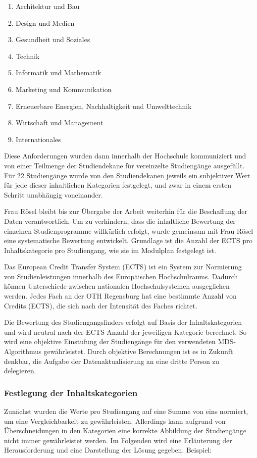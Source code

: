 \begin{enumerate}
    \item Architektur und Bau
    \item Design und Medien
    \item Gesundheit und Soziales
    \item Technik
    \item Informatik und Mathematik
    \item Marketing und Kommunikation
    \item Erneuerbare Energien, Nachhaltigkeit und Umwelttechnik
    \item Wirtschaft und Management
    \item Internationales
\end{enumerate}

Diese Anforderungen wurden dann innerhalb der Hochschule kommuniziert und von einer Teilmenge der Studiendekane für vereinzelte Studiengänge ausgefüllt. Für 22 Studiengänge wurde von den Studiendekanen jeweils ein subjektiver Wert für jede dieser inhaltlichen Kategorien festgelegt, und zwar in einem ersten Schritt unabhängig voneinander. %

Frau Rösel bleibt bis zur Übergabe der Arbeit weiterhin für die Beschaffung der Daten verantwortlich. Um zu verhindern, dass die inhaltliche Bewertung der einzelnen Studienprogramme willkürlich erfolgt, wurde gemeinsam mit Frau Rösel eine systematische Bewertung entwickelt. Grundlage ist die Anzahl der ECTS pro Inhaltskategorie pro Studiengang, wie sie im Modulplan festgelegt ist.

Das European Credit Transfer System (ECTS) ist ein System zur Normierung von Studienleistungen innerhalb des Europäischen Hochschulraums. Dadurch können Unterschiede zwischen nationalen Hochschulsystemen ausgeglichen werden. \parencite{european_commission_europaisches_nodate} Jedes Fach an der OTH Regensburg hat eine bestimmte Anzahl von Credits (ECTS), die sich nach der Intensität des Faches richtet.

Die Bewertung des Studiengangsfinders erfolgt auf Basis der Inhaltskategorien und wird neutral nach der ECTS-Anzahl der jeweiligen Kategorie berechnet. So wird eine objektive Einstufung der Studiengänge für den verwendeten MDS-Algorithmus gewährleistet. Durch objektive Berechnungen ist es in Zukunft denkbar, die Aufgabe der Datenaktualisierung an eine dritte Person zu delegieren.

\subsubsection{Festlegung der Inhaltskategorien}
Zunächst wurden die Werte pro Studiengang auf eine Summe von eins normiert, um eine Vergleichbarkeit zu gewährleisten. Allerdings kann aufgrund von Überschneidungen in den Kategorien eine korrekte Abbildung der Studiengänge nicht immer gewährleistet werden. Im Folgenden wird eine Erläuterung der Herausforderung und eine Darstellung der Lösung gegeben.\newline
Beispiel:

